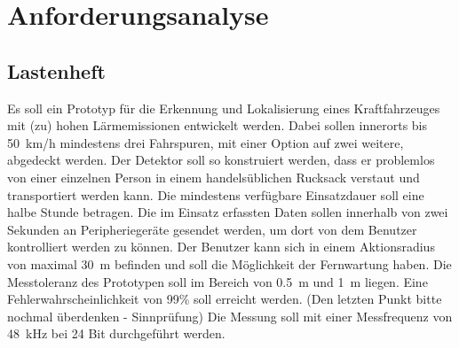 \section{Anforderungsanalyse}

\subsection{Lastenheft}

Es soll ein Prototyp für die Erkennung und Lokalisierung eines Kraftfahrzeuges mit (zu) hohen Lärmemissionen entwickelt werden. Dabei sollen innerorts bis \SI{50}{km/h} mindestens drei Fahrspuren, mit einer Option auf zwei weitere, abgedeckt werden. Der Detektor soll so konstruiert werden, dass er problemlos von einer einzelnen Person in einem handelsüblichen Rucksack verstaut und transportiert werden kann. Die mindestens verfügbare Einsatzdauer soll eine halbe Stunde betragen. Die im Einsatz erfassten Daten sollen innerhalb von zwei Sekunden an Peripheriegeräte gesendet werden, um dort von dem Benutzer kontrolliert werden zu können. Der Benutzer kann sich in einem Aktionsradius von maximal \SI{30}{m} befinden und soll die Möglichkeit der Fernwartung haben. Die Messtoleranz des Prototypen soll im Bereich von \SI{0,5}{m} und \SI{1}{m} liegen. Eine Fehlerwahrscheinlichkeit von 99\% soll erreicht werden. (\color{red}Den letzten Punkt bitte nochmal überdenken - Sinnprüfung\color{black}) Die Messung soll mit einer Messfrequenz von \SI{48}{kHz} bei 24 Bit durchgeführt werden.